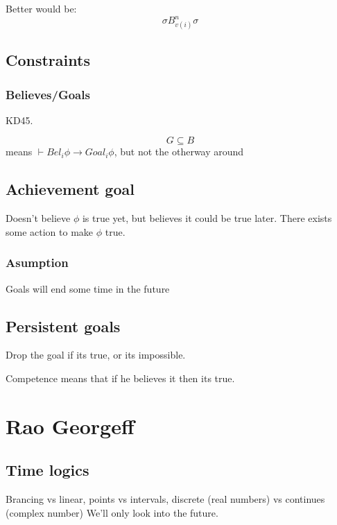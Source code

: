 \documentclass{article}
\begin{document}
Better would be:
\[\sigma B_{v(i)}^n \sigma\]

\subsection{Constraints}
\subsubsection{Believes/Goals}
KD45.

\[G\subseteq B\]
means $\vdash {Bel}_i \phi \to {Goal}_i\phi$, but not the otherway around

\subsection{Achievement goal}
Doesn't believe $\phi$ is true yet, but believes it could be true later.
There exists some action to make $\phi$ true.

\subsubsection{Asumption}
Goals will end some time in the future

\subsection{Persistent goals}
Drop the goal if its true, or its impossible.

Competence means that if he believes it then its true.

\section{Rao Georgeff}
\subsection{Time logics}
Brancing vs linear, points vs intervals,
discrete (real numbers) vs continues (complex number)
We'll only look into the future.
\end{document}
